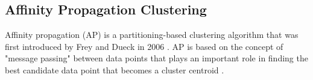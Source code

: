 





\subsection{Affinity Propagation Clustering}

Affinity propagation (AP) is a partitioning-based clustering algorithm that was first introduced by Frey and Dueck in 2006 \cite{frey2006mixture}. AP is based on the concept of "message passing" between data points that plays an important role in finding the best candidate data point that becomes a cluster centroid \cite{frey2007clustering, jiang2019exemplar}. 





